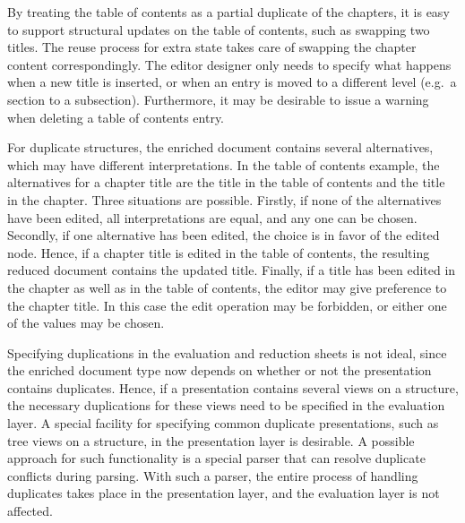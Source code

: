 By treating the table of contents as a partial duplicate of the chapters, it is easy to support structural updates on the table of contents, such as swapping two titles. The reuse process for extra state takes care of swapping the chapter content correspondingly. The editor designer only needs to specify what happens when a new title is inserted, or when an entry is moved to a different level (e.g.\ a section to a subsection). Furthermore, it may be desirable to issue a warning when deleting a table of contents entry.


\bc
For duplicate structures, the enriched document contains several alternatives, which may have different interpretations. In the table of contents example, the alternatives for a chapter title are the title in the table of contents and the title in the chapter. Three situations are possible. Firstly, if none of the alternatives have been edited, all interpretations are equal, and any one can be chosen. Secondly, if one alternative has been edited, the choice is in favor of the edited node. Hence, if a chapter title is edited in the table of contents, the resulting reduced document contains the updated title. Finally, if a title has been edited in the chapter as well as in the table of contents, the editor may give preference to the chapter title. In this case the edit operation may be forbidden, or either one of the values may be chosen.
\ec

\bc
Specifying duplications in the evaluation and reduction sheets is not ideal, since the enriched document type now depends on whether or not the presentation contains duplicates. Hence, if a presentation contains several views on a structure, the necessary duplications for these views need to be specified in the evaluation layer. A special facility for specifying common duplicate presentations, such as tree views on a structure, in the presentation layer is desirable. A possible approach for such functionality is a special parser that can resolve duplicate conflicts during parsing. With such a parser, the entire process of handling duplicates takes place in the presentation layer, and the evaluation layer is not affected. 
\ec

